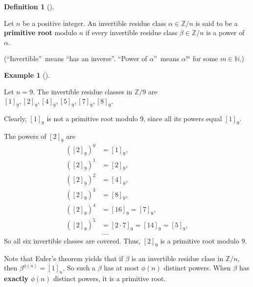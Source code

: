 \documentclass[numbers=enddot,12pt,final,onecolumn,notitlepage]{scrartcl}%
\numberwithin{exer}{subsection}
\theoremstyle{definition}
\newtheorem{defi}[theo]{Definition}
\newenvironment{definition}[1][]
{\begin{defi}[#1]\begin{leftbar}}
{\end{leftbar}\end{defi}}
\newtheorem{exam}[theo]{Example}
\newenvironment{example}[1][]
{\begin{exam}[#1]\begin{leftbar}}
{\end{leftbar}\end{exam}}
\begin{document}
\begin{definition}
Let $n$ be a positive integer. An invertible residue class $\alpha
\in\mathbb{Z}/n$ is said to be a \textbf{primitive root} modulo $n$ if every
invertible residue class $\beta\in\mathbb{Z}/n$ is a power of $\alpha$.

(\textquotedblleft Invertible\textquotedblright\ means \textquotedblleft has
an inverse\textquotedblright. \textquotedblleft Power of $\alpha
$\textquotedblright\ means $\alpha^{m}$ for some $m\in\mathbb{N}$.)
\end{definition}

\begin{example}
Let $n=9$. The invertible residue classes in $\mathbb{Z}/9$ are $\left[
1\right]  _{9},\left[  2\right]  _{9},\left[  4\right]  _{9},\left[  5\right]
_{9},\left[  7\right]  _{9},\left[  8\right]  _{9}$.

Clearly, $\left[  1\right]  _{9}$ is not a primitive root modulo $9$, since
all its powers equal $\left[  1\right]  _{9}$.

The powers of $\left[  2\right]  _{9}$ are
\begin{align*}
\left(  \left[  2\right]  _{9}\right)  ^{0}  &  =\left[  1\right]  _{9},\\
\left(  \left[  2\right]  _{9}\right)  ^{1}  &  =\left[  2\right]  _{9},\\
\left(  \left[  2\right]  _{9}\right)  ^{2}  &  =\left[  4\right]  _{9},\\
\left(  \left[  2\right]  _{9}\right)  ^{3}  &  =\left[  8\right]  _{9},\\
\left(  \left[  2\right]  _{9}\right)  ^{4}  &  =\left[  16\right]
_{9}=\left[  7\right]  _{9},\\
\left(  \left[  2\right]  _{9}\right)  ^{5}  &  =\left[  2\cdot7\right]
_{9}=\left[  14\right]  _{9}=\left[  5\right]  _{9},\\
&  \ldots.
\end{align*}
So all six invertible classes are covered. Thus, $\left[  2\right]  _{9}$ is a
primitive root modulo $9$.
\end{example}

Note that Euler's theorem yields that if $\beta$ is an invertible residue
class in $\mathbb{Z}/n$, then $\beta^{\phi\left(  n\right)  }=\left[
1\right]  _{n}$. So such a $\beta$ has at most $\phi\left(  n\right)  $
distinct powers. When $\beta$ has \textbf{exactly} $\phi\left(  n\right)  $
distinct powers, it is a primitive root.
\end{document}
